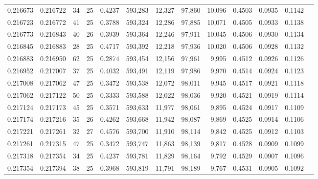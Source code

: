 \begin{tabular}{rrrrrrrrrrrrr}
0.216673 & 0.216722 &  34 &  25 &                                     0.4237 & 593,283 &  12,327 &  97,860 &  10,096 & 0.4503 & 0.0935 & 0.1142 \\
0.216723 & 0.216772 &  41 &  25 &                                     0.3788 & 593,324 &  12,286 &  97,885 &  10,071 & 0.4505 & 0.0933 & 0.1138 \\
0.216773 & 0.216843 &  40 &  26 &                                     0.3939 & 593,364 &  12,246 &  97,911 &  10,045 & 0.4506 & 0.0930 & 0.1134 \\
0.216845 & 0.216883 &  28 &  25 &                                     0.4717 & 593,392 &  12,218 &  97,936 &  10,020 & 0.4506 & 0.0928 & 0.1132 \\
0.216883 & 0.216950 &  62 &  25 &                                     0.2874 & 593,454 &  12,156 &  97,961 &   9,995 & 0.4512 & 0.0926 & 0.1126 \\
0.216952 & 0.217007 &  37 &  25 &                                     0.4032 & 593,491 &  12,119 &  97,986 &   9,970 & 0.4514 & 0.0924 & 0.1123 \\
0.217008 & 0.217062 &  47 &  25 &                                     0.3472 & 593,538 &  12,072 &  98,011 &   9,945 & 0.4517 & 0.0921 & 0.1118 \\
0.217062 & 0.217122 &  50 &  25 &                                     0.3333 & 593,588 &  12,022 &  98,036 &   9,920 & 0.4521 & 0.0919 & 0.1114 \\
0.217124 & 0.217173 &  45 &  25 &                                     0.3571 & 593,633 &  11,977 &  98,061 &   9,895 & 0.4524 & 0.0917 & 0.1109 \\
0.217174 & 0.217216 &  35 &  26 &                                     0.4262 & 593,668 &  11,942 &  98,087 &   9,869 & 0.4525 & 0.0914 & 0.1106 \\
0.217221 & 0.217261 &  32 &  27 &                                     0.4576 & 593,700 &  11,910 &  98,114 &   9,842 & 0.4525 & 0.0912 & 0.1103 \\
0.217261 & 0.217315 &  47 &  25 &                                     0.3472 & 593,747 &  11,863 &  98,139 &   9,817 & 0.4528 & 0.0909 & 0.1099 \\
0.217318 & 0.217354 &  34 &  25 &                                     0.4237 & 593,781 &  11,829 &  98,164 &   9,792 & 0.4529 & 0.0907 & 0.1096 \\
0.217354 & 0.217394 &  38 &  25 &                                     0.3968 & 593,819 &  11,791 &  98,189 &   9,767 & 0.4531 & 0.0905 & 0.1092 \\

\end{tabular}
